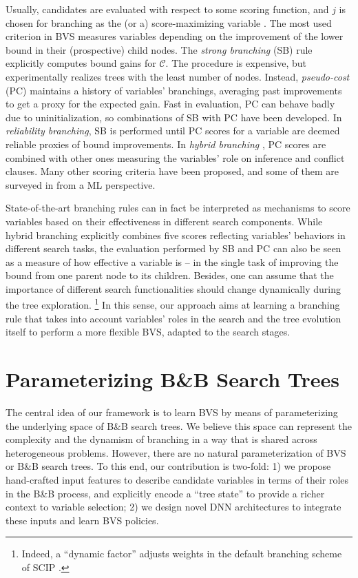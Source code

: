 \documentclass[letterpaper]{article} %
\begin{document}
{
Usually, candidates are evaluated with respect to some scoring function, and $j$ is chosen for branching as the (or a) score-maximizing variable \cite{AKM05}.
The most used criterion in BVS measures variables depending on the improvement of the lower bound in their (prospective) child nodes.
The \emph{strong branching} (SB) rule \cite{ApplegateSB} explicitly computes bound gains for $\mathcal{C}$.
The procedure is expensive, but experimentally realizes trees with the least number of nodes.
Instead, \emph{pseudo-cost} (PC) \cite{BGGH71} maintains a history of variables' branchings, averaging past improvements to get a proxy for the expected gain.
Fast in evaluation, PC can behave badly due to uninitialization, so combinations of SB with PC have been developed.
In \emph{reliability branching}, SB is performed until PC scores for a variable are deemed reliable proxies of bound improvements.
In \emph{hybrid branching} \cite{achterberg_hybrid_2009}, PC scores are combined with other ones measuring the variables' role on inference and conflict clauses.
Many other scoring criteria have been proposed, and some of them are surveyed in \citeauthor{Lodi2017} from a ML perspective.

State-of-the-art branching rules can in fact be interpreted as mechanisms to score variables based on their effectiveness in different search components.
While hybrid branching explicitly combines five scores reflecting variables' behaviors in different search tasks, the evaluation performed by SB and PC can also be seen as a measure of how effective a variable is -- in the single task of improving the bound from one parent node to its children.
Besides, one can assume that the importance of different search functionalities should change dynamically during the tree exploration.
\footnote{Indeed, a ``dynamic factor'' adjusts weights in the default branching scheme of SCIP \cite{relpscost}.}
In this sense, our approach aims at learning a branching rule that takes into account variables' roles in the search and the tree evolution itself to perform a more flexible BVS, adapted to the search stages.
}

\section{Parameterizing B\&B Search Trees}
\label{sec:representations}

The central idea of our framework is to learn BVS by means of parameterizing the underlying space of B\&B search trees.
We believe this space can represent the complexity and the dynamism of branching in a way that is shared across heterogeneous problems.
However, there are no natural parameterization of BVS or B\&B search trees.
To this end, our contribution is two-fold: 1) we propose hand-crafted input features to describe candidate variables in terms of their roles in the B\&B process, and explicitly encode a ``tree state'' to provide a richer context to variable selection; 2) we design novel DNN architectures to integrate these inputs and learn BVS policies.
\end{document}
